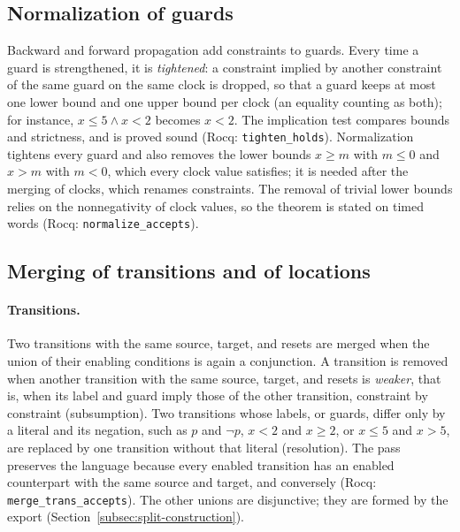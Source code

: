 \subsection{Normalization of guards}
\label{sec:normalize}
Backward and forward propagation add constraints to guards.  Every time a
guard is strengthened, it is \emph{tightened}: a constraint implied by another
constraint of the same guard on the same clock is dropped, so that a guard
keeps at most one lower bound and one upper bound per clock (an equality
counting as both); for instance, $x\le5\land x<2$ becomes $x<2$.  The
implication test compares bounds and strictness, and is proved sound (Rocq:
\texttt{tighten\_\allowbreak{}holds}).  Normalization tightens every guard and also
removes the lower bounds $x\ge m$ with $m\le0$ and $x>m$ with $m<0$, which every
clock value satisfies; it is needed after the merging of clocks, which renames
constraints.  The removal of trivial lower bounds relies on the nonnegativity
of clock values, so the theorem is stated on timed words (Rocq:
\texttt{normalize\_\allowbreak{}accepts}).

\subsection{Merging of transitions and of locations}
\label{sec:merge-ts}\label{sec:main-merge-ts}
\paragraph{Transitions.}
Two transitions with the same source, target, and resets are merged when the
union of their enabling conditions is again a conjunction.  A transition is
removed when another transition with the same source, target, and resets is
\emph{weaker}, that is, when its label and guard imply those of the other
transition, constraint by constraint (subsumption).  Two transitions
whose labels, or guards, differ only by a literal and its negation, such as
$p$ and $\neg p$, $x<2$ and $x\ge2$, or $x\le5$ and $x>5$, are replaced by one
transition without that literal (resolution).  The pass preserves the language
because every enabled transition has an enabled counterpart with the same
source and target, and conversely (Rocq: \texttt{merge\_\allowbreak{}trans\_\allowbreak{}accepts}).
The other unions are disjunctive; they are formed by the export
(Section~\ref{subsec:split-construction}).

